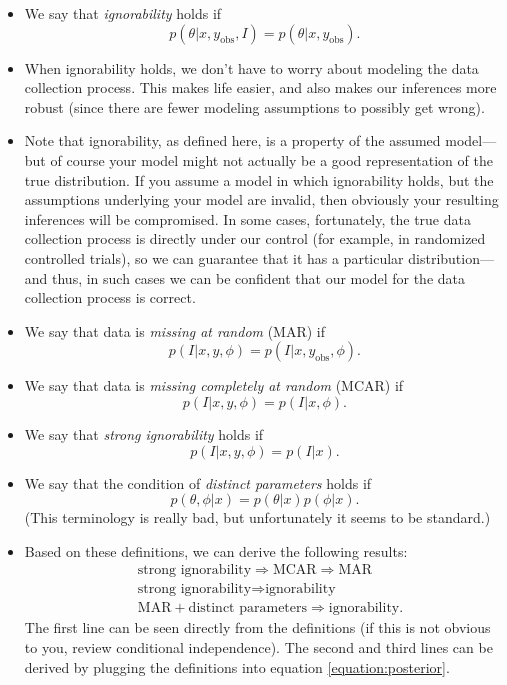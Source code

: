 \documentclass[12pt]{article}
\begin{document}
\begin{itemize}
\item We say that \textit{ignorability} holds if $$p(\theta | x,y_\text{obs},I) = p(\theta | x,y_\text{obs}). $$
\item When ignorability holds, we don't have to worry about modeling the data collection process. This makes life easier, and also makes our inferences more robust (since there are fewer modeling assumptions to possibly get wrong).
\item Note that ignorability, as defined here, is a property of the assumed model---but of course your model might not actually be a good representation of the true distribution. If you assume a model in which ignorability holds, but the assumptions underlying your model are invalid, then obviously your resulting inferences will be compromised. In some cases, fortunately, the true data collection process is directly under our control (for example, in randomized controlled trials), so we can guarantee that it has a particular distribution---and thus, in such cases we can be confident that our model for the data collection process is correct.
\item We say that data is \textit{missing at random} (MAR) if 
$$ p(I | x,y,\phi) = p(I | x,y_\text{obs},\phi). $$
\item We say that data is \textit{missing completely at random} (MCAR) if 
$$ p(I | x,y,\phi) = p(I | x,\phi). $$
\item We say that \textit{strong ignorability} holds if 
$$ p(I | x,y,\phi) = p(I | x). $$
\item We say that the condition of \textit{distinct parameters} holds if $$p(\theta,\phi | x) = p(\theta | x) p(\phi | x). $$ (This terminology is really bad, but unfortunately it seems to be standard.)
\item  Based on these definitions, we can derive the following results:
\begin{align*}
& \text{strong ignorability} \Longrightarrow \text{MCAR} \Longrightarrow \text{MAR}\\
& \text{strong ignorability} \Longrightarrow \text{ignorability}\\
& \text{MAR} + \text{distinct parameters} \Longrightarrow \text{ignorability}.
\end{align*}
The first line can be seen directly from the definitions (if this is not obvious to you, review conditional independence). The second and third lines can be derived by plugging the definitions into equation \ref{equation:posterior}.
\end{itemize}
\end{document}
